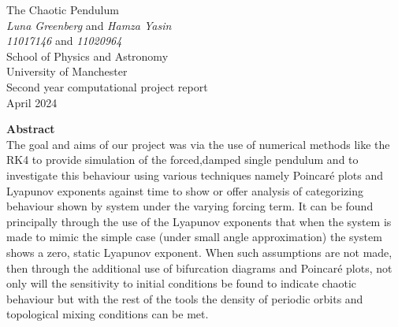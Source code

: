 \documentclass[11pt]{article} %
\begin{document}

\begin{titlepage} %
\begin{center} %

{\Huge The Chaotic Pendulum}\\[0.5cm] %
\textit{Luna Greenberg} and \textit{Hamza Yasin}~\\[0.3cm] %
\textit{11017146} and \textit{11020964}~\\[0.3cm]
School of Physics and Astronomy~\\[0.3cm]
University of Manchester~\\[0.3cm]
Second year computational project report~\\[0.3cm]
April 2024~\\[2cm]


\end{center}
{\Large \textbf{Abstract}}~\\[0.3cm]
The goal and aims of our project was via the use of numerical methods like the RK4 to provide simulation of the forced,damped single pendulum and to investigate this behaviour using various techniques namely Poincar\'e plots and Lyapunov exponents against time to show or offer analysis of categorizing behaviour shown by system under the varying forcing term. It can be found principally through the use of the Lyapunov exponents that when the system is made to mimic the simple case (under small angle approximation) the system shows a zero, static Lyapunov exponent. When such assumptions are not made, then through the additional use of bifurcation diagrams and Poincar\'e plots, not only will the sensitivity to initial conditions be found to indicate chaotic behaviour but with the rest of the tools the density of periodic orbits and topological mixing conditions can be met.

\end{titlepage}
\clearpage
{} %
\setcounter{page}{2} %

\newpage %
\end{document}
